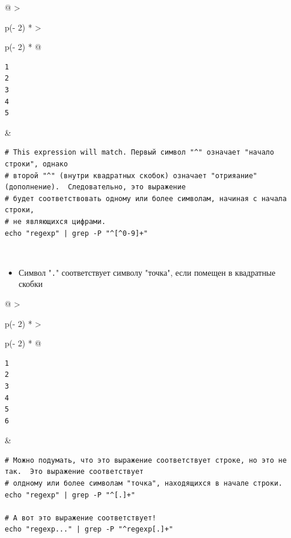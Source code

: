 \documentclass{article}
\begin{document}
\begin{longtable}[]{@{}
  >{\raggedright\arraybackslash}p{(\columnwidth - 2\tabcolsep) * }
  >{\raggedright\arraybackslash}p{(\columnwidth - 2\tabcolsep) * }@{}}
\toprule
\endhead
\begin{minipage}[t]{\linewidth}\raggedright
\begin{verbatim}
1
2
3
4
5
\end{verbatim}
\end{minipage} & \begin{minipage}[t]{\linewidth}\raggedright
\begin{verbatim}
# This expression will match. Первый символ "^" означает "начало строки", однако
# второй "^" (внутри квадратных скобок) означает "отрияание" (дополнение).  Следовательно, это выражение
# будет соответствовать одному или более символам, начиная с начала строки,
# не являющихся цифрами.
echo "regexp" | grep -P "^[^0-9]+"
\end{verbatim}
\end{minipage} \\ \addlinespace
\bottomrule
\end{longtable}

\begin{itemize}
\tightlist
\item
  Символ "\texttt{.}" соответствует символу "точка", если помещен в
  квадратные скобки
\end{itemize}

\begin{longtable}[]{@{}
  >{\raggedright\arraybackslash}p{(\columnwidth - 2\tabcolsep) * }
  >{\raggedright\arraybackslash}p{(\columnwidth - 2\tabcolsep) * }@{}}
\toprule
\endhead
\begin{minipage}[t]{\linewidth}\raggedright
\begin{verbatim}
1
2
3
4
5
6
\end{verbatim}
\end{minipage} & \begin{minipage}[t]{\linewidth}\raggedright
\begin{verbatim}
# Можно подумать, что это выражение соответствует строке, но это не так.  Это выражение соответствует
# олдному или более символам "точка", находящихся в начале строки.
echo "regexp" | grep -P "^[.]+"

# А вот это выражение соответствует!
echo "regexp..." | grep -P "^regexp[.]+"
\end{verbatim}
\end{minipage} \\ \addlinespace
\bottomrule
\end{longtable}
\end{document}
